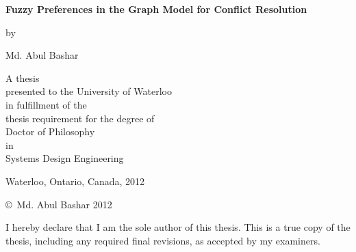
\pagestyle{empty}

\begin{titlepage}
   \begin{center}
      \vspace*{-3.5mm}

        \Huge
        {\bf Fuzzy Preferences in the Graph Model for Conflict Resolution}

      \vspace{10mm}

        \normalsize
        by \\

        \vspace{7mm}

        \Large
        Md. Abul Bashar \\

        \vspace{20mm}

        \normalsize
        A thesis \\
        presented to the University of Waterloo \\
        in fulfillment of the \\
        thesis requirement for the degree of \\
        Doctor of Philosophy \\
        in \\
        Systems Design Engineering \\

        \vspace{20mm}

        Waterloo, Ontario, Canada, 2012 \\

        \vspace{7mm}

        \copyright\ Md. Abul Bashar 2012 \\
        \end{center}
\end{titlepage}

\pagestyle{plain}
\setcounter{page}{2}

\cleardoublepage




\noindent
I hereby declare that I am the sole author of this thesis. This is a true copy of the thesis, including any required final revisions, as accepted by my examiners.

